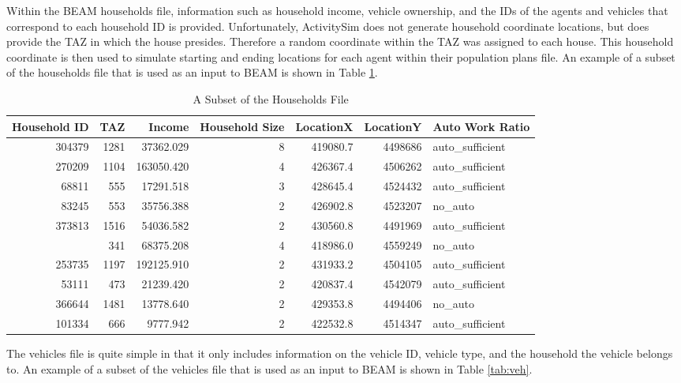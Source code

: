 \documentclass[12pt, oneside, openright]{byuthesis}
\begin{document}
Within the BEAM households file, information such as household income, vehicle ownership, and the IDs of the agents and vehicles that correspond to each household ID is provided. Unfortunately, ActivitySim does not generate household coordinate locations, but does provide the TAZ in which the house presides. Therefore a random coordinate within the TAZ was assigned to each house. This household coordinate is then used to simulate starting and ending locations for each agent within their population plans file. An example of a subset of the households file that is used as an input to BEAM is shown in Table \ref{tab:house}.

\begin{table}

\caption{\label{tab:house}A Subset of the Households File}
\centering
\begin{tabular}[t]{rrrrrrl}
\toprule
Household ID & TAZ & Income & Household Size & LocationX & LocationY & Auto Work Ratio\\
\midrule
304379 & 1281 & 37362.029 & 8 & 419080.7 & 4498686 & auto\_sufficient\\
270209 & 1104 & 163050.420 & 4 & 426367.4 & 4506262 & auto\_sufficient\\
68811 & 555 & 17291.518 & 3 & 428645.4 & 4524432 & auto\_sufficient\\
83245 & 553 & 35756.388 & 2 & 426902.8 & 4523207 & no\_auto\\
373813 & 1516 & 54036.582 & 2 & 430560.8 & 4491969 & auto\_sufficient\\
\addlinespace
574302 & 341 & 68375.208 & 4 & 418986.0 & 4559249 & no\_auto\\
253735 & 1197 & 192125.910 & 2 & 431933.2 & 4504105 & auto\_sufficient\\
53111 & 473 & 21239.420 & 2 & 420837.4 & 4542079 & auto\_sufficient\\
366644 & 1481 & 13778.640 & 2 & 429353.8 & 4494406 & no\_auto\\
101334 & 666 & 9777.942 & 2 & 422532.8 & 4514347 & auto\_sufficient\\
\bottomrule
\end{tabular}
\end{table}

The vehicles file is quite simple in that it only includes information on the vehicle ID, vehicle type, and the household the vehicle belongs to. An example of a subset of the vehicles file that is used as an input to BEAM is shown in Table \ref{tab:veh}.
\end{document}
